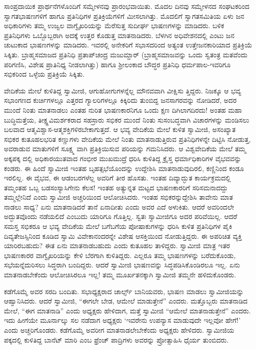 ಸಾಂಪ್ರದಾಯಿಕ ಪ್ರಾರ್ಥನೆಗಳೊಂದಿಗೆ ಸಮ್ಮೇಳನವು ಪ್ರಾರಂಭವಾಯಿತು. ಮೊದಲ ದಿನವು ಸಮ್ಮೇಳನದ ಸಂಘಟಕರಿಂದ ಸ್ವಾಗತಭಾಷಣಗಳಿಗೆ ಹಾಗೂ ಪ್ರತಿನಿಧಿಗಳ ಪ್ರತಿಕ್ರಿಯೆಗಳಿಗೆ ಮೀಸಲಾಗಿತ್ತು. ಮೊದಲಿಗೆ ಸ್ವಾಗತಸಮಿತಿಯ ಏಳು ಜನ ಅಧಿಕಾರಿಗಳು ತಮ್ಮ ಉಜ್ವಲ ವಾಗ್ವೈಖರಿಯನ್ನು ಮೆರೆಸುತ್ತ ಸುದೀರ್ಘ ಭಾಷಣಗಳನ್ನು ಮಾಡಿದರು. ಬಳಿಕ ಪ್ರತಿನಿಧಿಗಳು ಒಬ್ಬೊಬ್ಬರಾಗಿ ಅದಕ್ಕೆ ಉತ್ತರ ಕೊಡುತ್ತ ಮಾತನಾಡಿದರು. ಬೆಳಗಿನ ಅಧಿವೇಶನದಲ್ಲಿ ಎಂಟು ಜನ ಚುಟುಕಾದ ಭಾಷಣಗಳನ್ನು ಮಾಡಿದರು. ಇವರಲ್ಲಿ ಅನೇಕರಿಗೆ ಸಭಾಸದರಿಂದ ಅತ್ಯಂತ ಉತ್ತೇಜನಕಾರಿಯಾದ ಪ್ರತಿಕ್ರಿಯೆ ಸಿಕ್ಕಿತು. ಬ್ರಾಹ್ಮಸಮಾಜದ ಪ್ರತಿನಿಧಿ ಪ್ರತಾಪ್​ಚಂದ್ರ ಮಜುಮ್ದಾರ್ (ಬ್ರಾಹ್ಮಸಮಾಜವನ್ನು ಒಂದು ಸ್ವತಂತ್ರ ಮತವೆಂದು ಪರಿಗಣಿಸಿ, ವಿಶೇಷ ಪ್ರಾತಿನಿಧ್ಯ ನೀಡಲಾಗಿತ್ತು) ಹಾಗೂ ಶ್ರೀಲಂಕಾದ ಬೌದ್ಧರ ಪ್ರತಿನಿಧಿ ಧರ್ಮಪಾಲ-ಇವರಿಗೂ ಸಭಿಕರಿಂದ ಒಳ್ಳೆಯ ಪ್ರತಿಕ್ರಿಯೆ ಸಿಕ್ಕಿತು.

ವೇದಿಕೆಯ ಮೇಲೆ ಕುಳಿತಿದ್ದ ಸ್ವಾಮೀಜಿ, ಆಗುಹೋಗುಗಳನ್ನೆಲ್ಲ ಮೌನವವಾಗಿ ವೀಕ್ಷಿಸು ತ್ತಿದ್ದರು. ನಿಜಕ್ಕೂ ಆ ಭವ್ಯ ಸಭಾಂಗಣದ ಕುರ್ಚಿಗಳಲ್ಲೂ ಎತ್ತರದ ಗ್ಯಾಲರಿಗಳಲ್ಲೂ ಕಿಕ್ಕಿರಿದು ತುಂಬಿದ್ದ ಜನಸಾಗರವನ್ನು ನೋಡಿದರೆ, ಅದರ ಮುಂದೆ ನಿಂತು ಮಾತನಾಡಲು ಎಂತಹ ನುರಿತ ಭಾಷಣಕಾರನಿಗೂ ಒಂದು ಕ್ಷಣ ದಿಗಿಲಾಗದಿರದು! ಅಂತಹ ಮಹಾ ಬುದ್ಧಿಮತ್ತೆಯ, ತೀಕ್ಷ್ಣವಿಮರ್ಶಕರಾದ ಸಹಸ್ರಾರು ಸಭಿಕರ ಮುಂದೆ ನಿಂತು ಸುಸಂಬದ್ಧವಾಗಿ ವಿಚಾರಗಳನ್ನು ಮಂಡಿಸಲು ಬಲವಾದ ಆತ್ಮವಿಶ್ವಾಸ-ಆತ್ಮಶಕ್ತಿಗಳಿರಬೇಕಾಗುತ್ತದೆ. ಆ ಭವ್ಯ ವೇದಿಕೆಯ ಮೇಲೆ ಕುಳಿತ ಸ್ವಾಮೀಜಿ, ಅಸಂಖ್ಯಾತ ಸಭಿಕರ ಕುತೂಹಲಭರಿತ ಕಣ್ಣುಗಳು ವೇದಿಕೆಯ ಮೇಲೆ ನಿಂತು ಮಾತನಾಡುತ್ತಿರುವ ಪ್ರತಿನಿಧಿಗಳನ್ನೇ ದಿಟ್ಟಿಸಿ ನೋಡುತ್ತ, ಅವರಾಡುವ ಮಾತುಗಳಿಗೆ ಸೂಕ್ಷ್ಮ ವಾಗಿ ಪ್ರತಿಕ್ರಿಯಿಸುವ ಪರಿಯನ್ನು ಗಮನಿಸಿದರು. ಆ ವಿಶ್ವವೇದಿಕೆಯ ಮೇಲೆ ತಮ್ಮ ಅಕ್ಕಪಕ್ಕ ದಲ್ಲಿ ಅಧಿಕಾರಯುತವಾದ ಗಂಭೀರ ಮುಖಮುದ್ರೆ ಧರಿಸಿ ಕುಳಿತಿದ್ದ ಕ್ರೈಸ್ತ ಧರ್ಮಾಧಿಕಾರಿಗಳ ವೈಭವವನ್ನು ಕಂಡರು. ಈ ಹಿಂದೆ ಸ್ವಾಮೀಜಿ ಇಂತಹ ಬೃಹತ್ಸಭೆಯೊಂದನ್ನು ಉದ್ದೇಶಿಸಿ ಮಾತನಾಡುವುದಿರಲಿ, ಕಣ್ಣಿನಿಂದ ಕಂಡೂ ಇರಲಿಲ್ಲ. ಈ ವೈಭವ, ಈ ಆಡಂಬರಗಳೆಲ್ಲ ಅವರಿಗೆ ತೀರ ಹೊಸತು. ಇಂತಹ ದಿವ್ಯಾದ್ಭುತ ಕಾರ್ಯಕ್ರಮದಲ್ಲಿ ತಮ್ಮಂತಹ ಒಬ್ಬ ಬಡಸಂಸ್ಯಾಸಿಗೇನು ಕೆಲಸ! ಇಂತಹ ಅತ್ಯುನ್ನತ ಮಟ್ಟದ ಭಾಷಣಕಾರರಿಗೆ ಸರಿಸಮನಾದದ್ದು ತಮ್ಮಲ್ಲೇನಿದೆ ಎಂದು ಸ್ವಾಮೀಜಿ ಅಚ್ಚರಿಯಿಂದ ಆಲೋಚಿಸಿದರು. ಇಂತಹ ಸಭಿಕರನ್ನುದ್ದೇಶಿಸಿ ತಾವೇನು ಮಾತ ನಾಡಲು ಸಾಧ್ಯ? ಏನು ಮಾತನಾಡಿದರೆ ತಾನೆ ಏನಾದೀತು ಎಂದು ಅವರ ಎದೆ ಅಳುಕಿತು. ಆದರೆ ಅವರಿಂದಲೇ ಅದ್ಭುತವೊಂದು ನಡೆಯಲಿದೆ ಎಂಬುದು ಯಾರಿಗೂ ಗೊತ್ತಿಲ್ಲ. ಸ್ವತಃ ಸ್ವಾಮೀಜಿಗೂ ಅದರ ಪರಿವೆಯಿಲ್ಲ. ಆದರೆ ಸಮಸ್ತ ಸಭಿಕರೂ ಆ ಭವ್ಯ ವೇದಿಕೆಯ ಮೇಲೆ ಬಗೆಬಗೆಯ ಪೋಷಾಕುಗಳನ್ನು ಧರಿಸಿ ಕುಳಿತ ಪ್ರತಿನಿಧಿಗಳ ಪೈಕಿ ದಿವ್ಯತೇಜಸ್ಸಿನಿಂದ ಕೂಡಿದ ಸ್ವಾಮಿ ವಿವೇಕಾನಂದರನ್ನೇ ವಿಶೇಷ ಆಸಕ್ತಿಯಿಂದ ನೋಡುತ್ತಿದ್ದರು. ಈ ಅಪರಿಚಿತ ವ್ಯಕ್ತಿ ಯಾರಿರಬಹುದು? ಈತ ಏನು ಮಾತನಾಡಬಹುದು ಎಂದು ಕುತೂಹಲ ತಾಳಿದ್ದರು. ಸ್ವಾಮೀಜಿ ಮಾತ್ರ ಇತರ ಭಾಷಣಕಾರರ ವಾಗ್ವೈಖರಿಯನ್ನು ಕೇಳಿ ಬೆರಗಾಗಿ ಕುಳಿತಿದ್ದರು. ಎಲ್ಲರೂ ತಮ್ಮ ಭಾಷಣಗಳನ್ನು ಬರೆದುಕೊಂಡು, ಸಭೆಯನ್ನೆದುರಿಸಲು ಸಿದ್ಧರಾಗಿ ಬಂದಿದ್ದರು. ಆದರೆ ಸ್ವಾಮೀಜಿ ಭಾಷಣವನ್ನು ಸಿದ್ಧಪಡಿಸಿಕೊಂಡಿರಲೂ ಇಲ್ಲ. ಏನು ಮಾತನಾಡಬೇಕೆಂದು ಆಲೋಚಿಸಿರಲೂ ಇಲ್ಲ! ತಮ್ಮ ಮೂರ್ಖತನಕ್ಕಾಗಿ ಸ್ವಾಮೀಜಿ ತಮ್ಮನೇ ಹಳಿದುಕೊಂಡರು.

ಕಡೆಗೊಮ್ಮೆ ಅವರ ಸರದಿ ಬಂದಿತು. ಸಭಾಧ್ಯಕ್ಷರಾದ ಚಾರ್ಲ್ಸ್ ಬಾನಿಯವರು, ಭಾಷಣ ಮಾಡಲು ಸ್ವಾಮೀಜಿಯನ್ನು ಆಹ್ವಾನಿಸಿದರು. ಆದರೆ ಸ್ವಾಮೀಜಿ, “ಈಗಲೇ ಬೇಡ, ಆಮೇಲೆ ಮಾಡುತ್ತೇನೆ” ಎಂದರು. ಮತ್ತೊಬ್ಬರು ಮಾತನಾಡಿದ ಮೇಲೆ, “ಈಗ ಮಾತನಾಡಿ” ಎಂದು ಅಧ್ಯಕ್ಷರು ಹೇಳಿದಾಗ, ಮತ್ತೆ ಸ್ವಾಮೀಜಿ “ಆಮೇಲೆ ಮಾತನಾಡುತ್ತೇನೆ” ಎಂದರು. ಇದು ಹೀಗೆಯೇ ಮೂರ್ನಾಲ್ಕು ಸಲ ನಡೆದಾಗ ಅಧ್ಯಕ್ಷರು ‘ಇವರೇನು ಉಪನ್ಯಾಸ ಮಾಡುವುದೇ ಇಲ್ಲವೋ ಹೇಗೆ!’ ಎಂದು ಅಚ್ಚರಿಗೊಂಡರು. ಕಡೆಗೊಮ್ಮೆ ಅವರೀಗ ಮಾತನಾಡಲೇಬೇಕೆಂದು ಅಧ್ಯಕ್ಷರು ಹೇಳಿದರು. ಸ್ವಾಮೀಜಿಯ ಪಕ್ಕದಲ್ಲಿ ಕುಳಿತಿದ್ದ ಬಾನೆಟ್ ಮಾರಿ ಎಂಬ ಫ್ರೆಂಚ್ ಪಾದ್ರಿಗಳು ಅವರನ್ನು ಪ್ರೋತ್ಸಾಹಿಸಿ ಧೈರ್ಯ ತುಂಬಿದರು.

